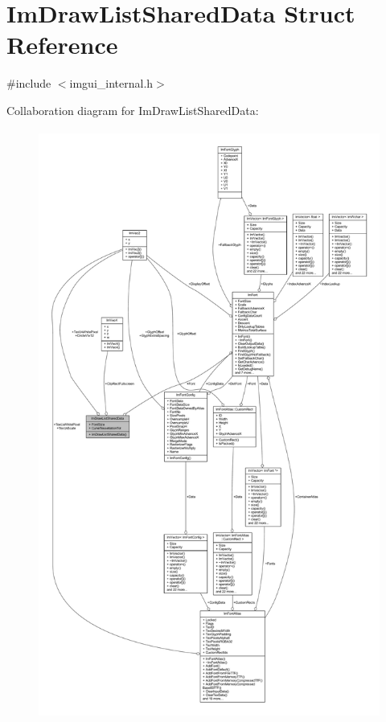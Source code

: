 \hypertarget{struct_im_draw_list_shared_data}{}\section{Im\+Draw\+List\+Shared\+Data Struct Reference}
\label{struct_im_draw_list_shared_data}


{\ttfamily \#include $<$imgui\+\_\+internal.\+h$>$}



Collaboration diagram for Im\+Draw\+List\+Shared\+Data\+:
\nopagebreak
\begin{figure}[H]
\begin{center}
\leavevmode
\includegraphics[height=550pt]{struct_im_draw_list_shared_data__coll__graph}
\end{center}
\end{figure}
